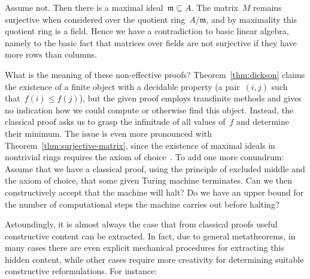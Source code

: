 \documentclass[10pt,reqno,a4paper,openany]{amsbook}
\makeatletter
\theoremstyle{definition}
\theoremstyle{plain}
\theoremstyle{remark}
\newcommand{\mmm}{\mathfrak{m}}
\newcommand{\?}{\,{:}\,}
\renewcommand{\_}{\mathpunct{.}\,}
\renewenvironment{proof}[1][\proofname]{\par
  \pushQED{\qed}%
  \normalfont \topsep6\p@\@plus6\p@\relax
  \trivlist
  \item[\hskip\labelsep
        \itshape
    #1\@addpunct{.}]\ignorespaces
}{%
  \popQED\endtrivlist\@endpefalse
}
\makeatother
\begin{document}
\begin{proof}[Proof (classical)]Assume not. Then there is a maximal
ideal~$\mmm \subseteq A$. The matrix~$M$ remains surjective when considered over
the quotient ring~$A/\mmm$, and by maximality this quotient ring is a field.
Hence we have a contradiction to basic linear algebra, namely to the basic fact
that matrices over fields are not surjective if they have more rows than
columns.\end{proof}

What is the meaning of these non-effective proofs? Theorem~\ref{thm:dickson}
claims the existence of a finite object with a decidable property (a
pair~$(i,j)$ such that~$f(i) \leq f(j)$), but the given proof employs
transfinite methods and gives no indication how we could compute or otherwise
find this object. Instead, the classical proof asks us to grasp the infinitude
of all values of~$f$ and determine their minimum. The issue is even more
pronounced with Theorem~\ref{thm:surjective-matrix}, since the existence of
maximal ideals in nontrivial rings requires the axiom of
choice~\cite{scott:prime-ideals,hodges:krull,banaschewski:krull,erne:krull,howard-rubin:ac}.
To add one more conundrum: Assume that we have a classical proof, using the principle
of excluded middle and the axiom of choice, that some given Turing machine
terminates. Can we then constructively accept that the machine will halt? Do we
have an upper bound for the number of computational steps the machine carries
out before halting?

Astoundingly, it is almost always the case that from classical proofs useful
constructive content can be extracted. In fact, due to general metatheorems,
in many cases there are even explicit mechanical procedures for extracting this
hidden content, while other cases require more creativity for determining
suitable constructive reformulations. For instance:
\end{document}
